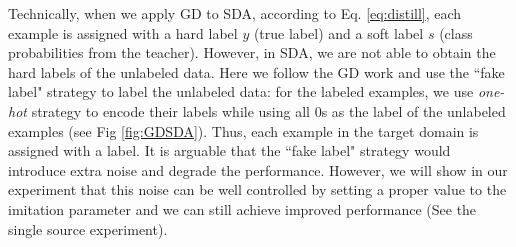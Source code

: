 Technically, when we apply GD to SDA, according to Eq. \eqref{eq:distill}, each example is assigned with a hard label $y$ (true label) and a soft label $s$ (class probabilities from the teacher). However, in SDA, we are not able to obtain the hard labels of the unlabeled data. Here we follow the GD work\cite{lopez2015unifying} and use the ``fake label" strategy to label the unlabeled data: for the labeled examples, we use \textit{one-hot} strategy to encode their labels while using all 0s as the label of the unlabeled examples (see Fig \ref{fig:GDSDA}). Thus, each example in the target domain is assigned with a label. It is arguable that the ``fake label" strategy would introduce extra noise and degrade the performance. However, we will show in our experiment that this noise can be well controlled by setting a proper value to the imitation parameter and we can still achieve improved performance (See the single source experiment).

